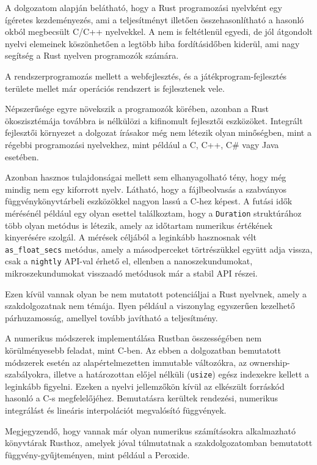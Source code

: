 A dolgozatom alapján belátható, hogy a Rust programozási nyelvként egy ígéretes kezdeményezés, ami a teljesítményt illetően összehasonlítható a hasonló okból megbecsült C/C++ nyelvekkel. A nem is feltétlenül egyedi, de jól átgondolt nyelvi elemeinek köszönhetően a legtöbb hiba fordításidőben kiderül, ami nagy segítség a Rust nyelven programozók számára.

A rendszerprogramozás mellett a webfejlesztés, és a játékprogram-fejlesztés területe mellet már operációs rendszert is fejlesztenek vele.

Népszerűsége egyre növekszik a programozók körében, azonban a Rust ökoszisztémája továbbra is nélkülözi a kifinomult fejlesztői eszközöket. Integrált fejlesztői környezet a dolgozat írásakor még nem létezik olyan minőségben, mint a régebbi programozási nyelvekhez, mint például a C, C++, C\# vagy Java esetében.

Azonban hasznos tulajdonságai mellett sem elhanyagolható tény, hogy még mindig nem egy kiforrott nyelv. Látható, hogy a fájlbeolvasás a szabványos függvénykönyvtárbeli eszközökkel nagyon lassú a C-hez képest. A futási idők mérésénél például egy olyan esettel találkoztam, hogy a \lstinline{Duration} struktúrához több olyan metódus is létezik, amely az időtartam numerikus értékének kinyerésére szolgál. A mérések céljából a leginkább hasznosnak vélt \lstinline{as_float_secs} metódus, amely a másodperceket törtrészükkel együtt adja vissza, csak a \lstinline{nightly} API-val érhető el, ellenben a nanoszekundumokat, mikroszekundumokat visszaadó metódusok már a stabil API részei.

Ezen kívül vannak olyan be nem mutatott potenciáljai a Rust nyelvnek, amely a szakdolgozatnak nem témája. Ilyen például a viszonylag egyszerűen kezelhető párhuzamosság, amellyel tovább javítható a teljesítmény.

A numerikus módszerek implementálása Rustban összességében nem körülményesebb feladat, mint C-ben. Az ebben a dolgozatban bemutatott módszerek esetén az alapértelmezetten immutable változókra, az ownership-szabályokra, illetve a határozottan előjel nélküli (\lstinline{usize}) egész indexekre kellett a leginkább figyelni. Ezeken a nyelvi jellemzőkön kívül az elkészült forráskód hasonló a C-s megfelelőjéhez. Bemutatásra kerültek rendezési, numerikus integrálást és lineáris interpolációt megvalósító függvények.

Megjegyzendő, hogy vannak már olyan numerikus számításokra alkalmazható könyvtárak Rusthoz, amelyek jóval túlmutatnak a szakdolgozatomban bemutatott függvény-gyűjteményen, mint például a Peroxide.

